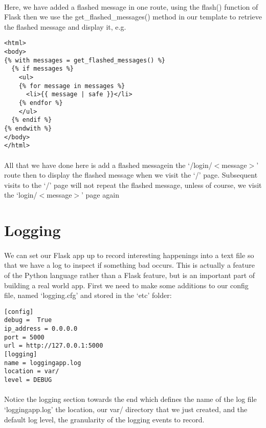 \documentclass[12pt, a4paper, twoside]{book}
\begin{document}
\paragraph{} Here, we have added a flashed message in one route, using the flash() function of Flask then we use the get\_flashed\_messages() method in our template to retrieve the flashed message and display it, e.g.

\begin{lstlisting}
<html>
<body>
{% with messages = get_flashed_messages() %}
  {% if messages %}
    <ul>
    {% for message in messages %}
      <li>{{ message | safe }}</li>
    {% endfor %}
    </ul>
  {% endif %}
{% endwith %}
</body>
</html>
\end{lstlisting}

\paragraph{} All that we have done here is add a flashed messagein the `/login/$<$message$>$' route then to display the flashed message when we visit the `/' page. Subsequent visits to the `/' page will not repeat the flashed message, unless of course, we visit the `login/$<$message$>$' page again

\section{Logging}
\label{logging}
\paragraph{} We can set our Flask app up to record interesting happenings into a text file so that we have a log to inspect if something bad occurs. This is actually a feature of the Python language rather than a Flask feature, but is an important part of building a real world app. First we need to make some additions to our config file, named `logging.cfg' and stored in the  `etc' folder:

\begin{lstlisting}
[config]
debug =  True
ip_address = 0.0.0.0
port = 5000
url = http://127.0.0.1:5000
[logging]
name = loggingapp.log
location = var/
level = DEBUG
\end{lstlisting}
\paragraph{} Notice the logging section towards the end which defines the name of the log file `loggingapp.log' the location, our var/ directory that we just created, and the default log level, the granularity of the logging events to record. 
\end{document}
